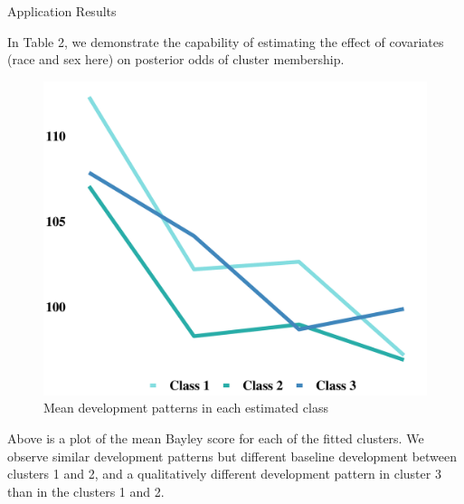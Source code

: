\documentclass[final]{beamer}
\newlength{\onecolwid}
\begin{document}
\begin{frame}[t]
\begin{columns}[t]
\begin{column}{\onecolwid}
\begin{block}{Application Results}
\

In Table 2, we demonstrate the capability of estimating the effect of covariates (race and sex here) on posterior odds of cluster membership. 

\begin{figure}
\includegraphics[height=0.8\linewidth,width=1\linewidth]{clust_trends.pdf}
\caption{Mean development patterns in each estimated class}
\end{figure}

Above is a plot of the mean Bayley score for each of the fitted clusters. We observe similar development patterns but different baseline development between clusters 1 and 2, and a qualitatively different development pattern in cluster 3 than in the clusters 1 and 2. 


\end{block}









\end{column}
\end{columns}
\end{frame}
\end{document}
